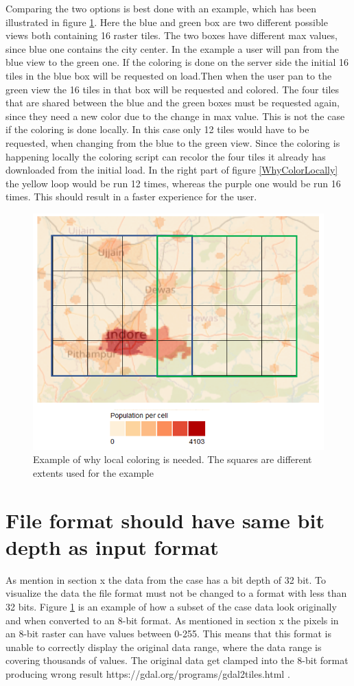 Comparing the two options is best done with an example, which has been illustrated in figure \ref{WhyColorLocallyMap}. Here the blue and green box are two different possible views both containing 16 raster tiles. The two boxes have different max values, since blue one contains the city center. In the example a user will pan from the blue view to the green one. If the coloring is done on the server side the initial 16 tiles in the blue box will be requested on load.Then when the user pan to the green view the 16 tiles in that box will be requested and colored. The four tiles that are shared between the blue and the green boxes must be requested again, since they need a new color due to the change in max value. This is not the case if the coloring is done locally. In this case only 12 tiles would have to be requested, when changing from the blue to the green view. Since the coloring is happening locally the coloring script can recolor the four tiles it already has downloaded from the initial load.  In the right part of figure \ref{WhyColorLocally} the yellow loop would be run 12 times, whereas the purple one would be run 16 times. This should result in a faster experience for the user.

\begin{figure} [H]
	\centering
	\includegraphics[width=.8\textwidth]{Pictures/WhyColorLocallyMap}
	\caption{Example of why local coloring is needed. The squares are different extents used for the example}
	\label{WhyColorLocallyMap}
\end{figure}

\section{File format should have same bit depth as input format}
As mention in section x the data from the case has a bit depth of 32 bit. To visualize the data the file format must not be changed to a format with less than 32 bits. Figure \ref{WhyColorLocallyMap} is an example of how a subset of the case data look originally and when converted to an 8-bit format. As mentioned in section x the pixels in an 8-bit raster can have values between 0-255. This means that this format is unable to correctly display the original data range, where the data range is covering thousands of values. The original data get clamped into the 8-bit format producing wrong result
https://gdal.org/programs/gdal2tiles.html .

